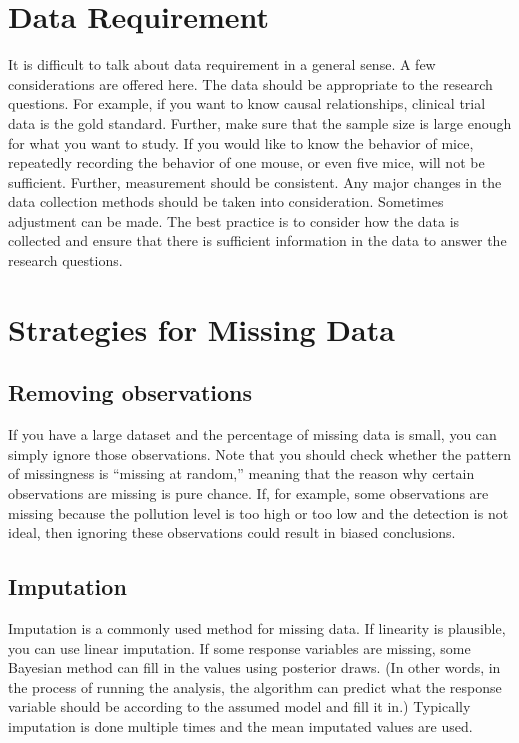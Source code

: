 \documentclass[
]{book}
\begin{document}
\hypertarget{data-requirement}{%
\section{Data Requirement}\label{data-requirement}}

It is difficult to talk about data requirement in a general sense. A few considerations are offered here. The data should be appropriate to the research questions. For example, if you want to know causal relationships, clinical trial data is the gold standard. Further, make sure that the sample size is large enough for what you want to study. If you would like to know the behavior of mice, repeatedly recording the behavior of one mouse, or even five mice, will not be sufficient. Further, measurement should be consistent. Any major changes in the data collection methods should be taken into consideration. Sometimes adjustment can be made. The best practice is to consider how the data is collected and ensure that there is sufficient information in the data to answer the research questions.

\hypertarget{strategies-for-missing-data}{%
\section{Strategies for Missing Data}\label{strategies-for-missing-data}}

\hypertarget{removing-observations}{%
\subsection{Removing observations}\label{removing-observations}}

If you have a large dataset and the percentage of missing data is small, you can simply ignore those observations. Note that you should check whether the pattern of missingness is ``missing at random,'' meaning that the reason why certain observations are missing is pure chance. If, for example, some observations are missing because the pollution level is too high or too low and the detection is not ideal, then ignoring these observations could result in biased conclusions.

\hypertarget{imputation}{%
\subsection{Imputation}\label{imputation}}

Imputation is a commonly used method for missing data. If linearity is plausible, you can use linear imputation. If some response variables are missing, some Bayesian method can fill in the values using posterior draws. (In other words, in the process of running the analysis, the algorithm can predict what the response variable should be according to the assumed model and fill it in.) Typically imputation is done multiple times and the mean imputated values are used.
\end{document}
